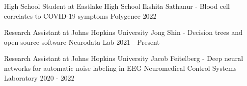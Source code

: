 \begin{cventries}
\cventry
    {High School Student at Eastlake High School} %
    {Ikshita Sathanur - Blood cell correlates to COVID-19 symptoms} %
    {Polygence} %
    {2022} %
    {\empty}
    \vspace{-\baselineskip}
    
\cventry
    {Research Assistant at Johns Hopkins University} %
    {Jong Shin - Decision trees and open source software} %
    {Neurodata Lab} %
    {2021 - Present} %
    {\empty}
    \vspace{-\baselineskip}
    
\cventry
    {Research Assistant at Johns Hopkins University} %
    {Jacob Feitelberg - Deep neural networks for automatic noise labeling in EEG} %
    {Neuromedical Control Systems Laboratory} %
    {2020 - 2022} %
    {\empty}
    \vspace{-\baselineskip}
    
\end{cventries}

